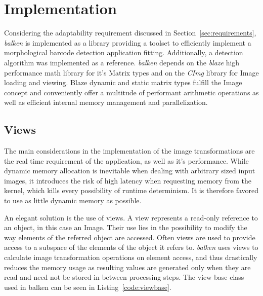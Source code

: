 \documentclass[runningheads,a4paper]{llncs}
\begin{document}
\section{Implementation}

Considering the adaptability requirement discussed in Section~\ref{sec:requirements}, \emph{balken} is
implemented as a library providing a toolset to efficiently implement a
morphological barcode detection application fitting. Additionally, a detection algorithm
was implemented as a reference. \emph{balken} depends on the \emph{blaze} high
performance math library for it's Matrix types and on the \emph{CImg} library for Image
loading and viewing. Blaze dynamic and static matrix types fulfill the
Image concept and conveniently offer a multitude of performant arithmetic
operations as well as efficient internal memory management and parallelization.

\subsection{Views}

The main considerations in the implementation of the image transformations are the real
time requirement of the application, as well as it's performance. While dynamic
memory allocation is inevitable when dealing with arbitrary sized input images,
it introduces the risk of high latency when requesting memory from the kernel,
which kills every possibility of runtime determinism. It is therefore
favored to use as little dynamic memory as possible.

An elegant solution is the use of views. A view represents a read-only reference
to an object, in this case an Image. Their use lies in the possibility to modify
the way elements of the referred object are accessed. Often views are used to
provide access to a subspace of the elements of the object it refers to.
\emph{balken} uses views to calculate image transformation operations on element
access, and thus drastically reduces the memory usage as resulting values are
generated only when they are read and need not be stored in between processing
steps. The view base class used in balken can be seen in
Listing~\ref{code:viewbase}. 
\end{document}
